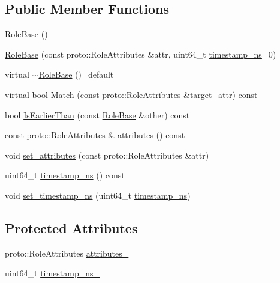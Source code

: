 \subsection*{Public Member Functions}
\begin{DoxyCompactItemize}
\item 
\hyperlink{classapollo_1_1cyber_1_1service__discovery_1_1RoleBase_ae315109815146e813f916c69a6d0e471}{Role\-Base} ()
\item 
\hyperlink{classapollo_1_1cyber_1_1service__discovery_1_1RoleBase_a27f89a9132f5d4c5f14fc80cc0a8cdd8}{Role\-Base} (const proto\-::\-Role\-Attributes \&attr, uint64\-\_\-t \hyperlink{classapollo_1_1cyber_1_1service__discovery_1_1RoleBase_afada3e0a6c73eefed35c47088e3540c1}{timestamp\-\_\-ns}=0)
\item 
virtual \hyperlink{classapollo_1_1cyber_1_1service__discovery_1_1RoleBase_aa58a312413de47759b7e1804f95b8826}{$\sim$\-Role\-Base} ()=default
\item 
virtual bool \hyperlink{classapollo_1_1cyber_1_1service__discovery_1_1RoleBase_a978606cd4f07e64a7d77351919bd179d}{Match} (const proto\-::\-Role\-Attributes \&target\-\_\-attr) const 
\item 
bool \hyperlink{classapollo_1_1cyber_1_1service__discovery_1_1RoleBase_aa5d6ba4b19a3ad10591906b7e608be9e}{Is\-Earlier\-Than} (const \hyperlink{classapollo_1_1cyber_1_1service__discovery_1_1RoleBase}{Role\-Base} \&other) const 
\item 
const proto\-::\-Role\-Attributes \& \hyperlink{classapollo_1_1cyber_1_1service__discovery_1_1RoleBase_aa6ea8b1374c9ee7b7529f005602fc093}{attributes} () const 
\item 
void \hyperlink{classapollo_1_1cyber_1_1service__discovery_1_1RoleBase_a8063abba789b4f7e20041474151f02b2}{set\-\_\-attributes} (const proto\-::\-Role\-Attributes \&attr)
\item 
uint64\-\_\-t \hyperlink{classapollo_1_1cyber_1_1service__discovery_1_1RoleBase_afada3e0a6c73eefed35c47088e3540c1}{timestamp\-\_\-ns} () const 
\item 
void \hyperlink{classapollo_1_1cyber_1_1service__discovery_1_1RoleBase_a1ed0b88013f6022905e44be936fcea21}{set\-\_\-timestamp\-\_\-ns} (uint64\-\_\-t \hyperlink{classapollo_1_1cyber_1_1service__discovery_1_1RoleBase_afada3e0a6c73eefed35c47088e3540c1}{timestamp\-\_\-ns})
\end{DoxyCompactItemize}
\subsection*{Protected Attributes}
\begin{DoxyCompactItemize}
\item 
proto\-::\-Role\-Attributes \hyperlink{classapollo_1_1cyber_1_1service__discovery_1_1RoleBase_a742fc81c6ef01ad748e01c412730df59}{attributes\-\_\-}
\item 
uint64\-\_\-t \hyperlink{classapollo_1_1cyber_1_1service__discovery_1_1RoleBase_a7ae2440654a64c4c5ef933005ea0870e}{timestamp\-\_\-ns\-\_\-}
\end{DoxyCompactItemize}


